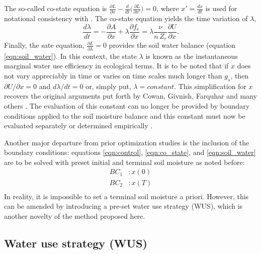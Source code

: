 \documentclass[utf8]{frontiersSCNS} %
\begin{document}
The so-called co-state equation is $\frac{\partial L}{\partial x} - \frac{d}{dt} \Big(\frac{\partial L}{\partial x'} \Big) = 0$, where $x'= \frac{dx}{dt}$ is used for notational consistency with \citet{witelski_variational_2015}. The co-state equation yields the time variation of $\lambda$,
\begin{equation}
    \label{eqn:co_state}
    \frac{d \lambda}{dt} = - \frac{\partial A}{\partial x} + \lambda \frac{\partial f_e}{\partial x} = \lambda \frac{\nu}{n\, Z_r} \frac{\partial U}{\partial x}.
\end{equation}
Finally, the sate equation, $\frac{\partial L}{\partial \lambda} = 0$ provides the soil water balance (equation \ref{eqn:soil_water}). In this context, the state $\lambda$ is known as the instantaneous marginal water use efficiency in ecological terms. It is to be noted that if $x$ does not vary appreciably in time or varies on time scales much longer than $g_s$, then $\partial U/{\partial x} = 0$ and $d\lambda/dt=0$ or, simply put, $\lambda = constant$.  This simplification for $x$ recovers the original arguments put forth by Cowan, Givnish, Farquhar and many others \citep{cowan_stomatal_1977,hari1986optimal,konrad2008modelling,katul_stomatal_2009,medlyn2011reconciling}.  The evaluation of this constant can no longer be provided by boundary conditions applied to the soil moisture balance and this constant must now be evaluated separately or determined empirically \citep{manzoni_optimization_2013}.  

Another major departure from prior optimization studies is the inclusion of the boundary conditions: equations \ref{eqn:control}, \ref{eqn:co_state}, and \ref{eqn:soil_water} are to be solved with preset initial and terminal soil moisture as noted before:
\begin{equation}
    \label{eqn: BC_no_WUS}
    \begin{split}
        BC_1 &:x(0)\\
        BC_2 &:x(T)\\
    \end{split}
\end{equation}
In reality, it is impossible to set a terminal soil moisture a priori. However, this can be amended by introducing a pre-set water use strategy (WUS), which is another novelty of the method proposed here.

\subsection{Water use strategy (WUS)}
\end{document}
